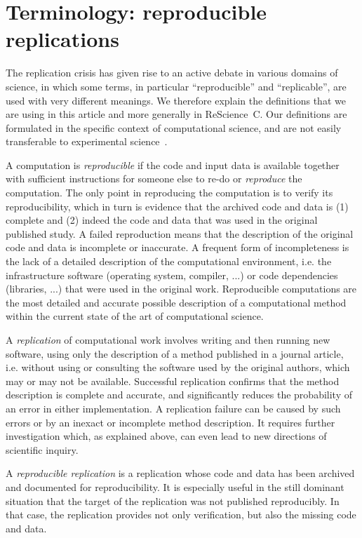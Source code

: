\documentclass[runningheads]{llncs}
\begin{document}
\section{Terminology: reproducible replications}

The replication crisis has given rise to an active debate in various domains of science, in which some terms, in particular ``reproducible'' and ``replicable'', are used with very different meanings. We therefore explain the definitions that we are using in this article and more generally in ReScience~C. Our definitions are formulated in the specific context of computational science, and are not easily transferable to experimental science~\cite{HinsenScientificsoftwaredifferent2018}.

A computation is \textit{reproducible} if the code and input data is available together with sufficient instructions for someone else to re-do or \textit{reproduce} the computation. The only point in reproducing the computation is to verify its reproducibility, which in turn is evidence that the archived code and data is (1) complete and (2) indeed the code and data that was used in the original published study. A failed reproduction means that the description of the original code and data is incomplete or inaccurate. A frequent form of incompleteness is the lack of a detailed description of the computational environment, i.e. the infrastructure software (operating system, compiler, ...) or code dependencies (libraries, ...) that were used in the original work. Reproducible computations are the most detailed and accurate possible description of a computational method within the current state of the art of computational science.

A \textit{replication} of computational work involves writing and then running new software, using only the description of a method published in a journal article, i.e. without using or consulting the software used by the original authors, which may or may not be available. Successful replication confirms that the method description is complete and accurate, and significantly reduces the probability of an error in either implementation. A replication failure can be caused by such errors or by an inexact or incomplete method description. It requires further investigation which, as explained above, can even lead to new directions of scientific inquiry.

A \textit{reproducible replication} is a replication whose code and data has been archived and documented for reproducibility. It is especially useful in the still dominant situation that the target of the replication was not published reproducibly. In that case, the replication provides not only verification, but also the missing code and data.
\end{document}
